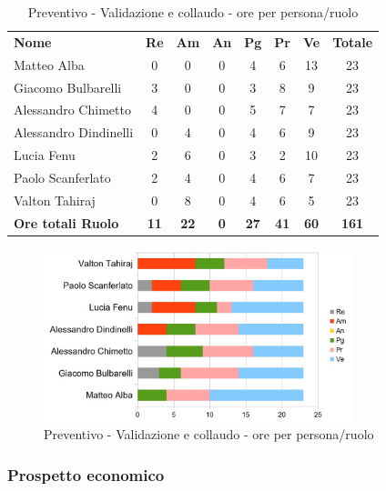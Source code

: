 		\begin{table} [h!]
			\begin{center}
				\begin{tabular} { m{3.5cm} c c c c c c c }
					\rowcolor{lightgray}
					\textbf{Nome} & \textbf{Re} & \textbf{Am} & \textbf{An} & \textbf{Pg} & \textbf{Pr} & \textbf{Ve} & \textbf{Totale} \\
					Matteo Alba & 0 & 0 & 0 & 4 & 6 & 13 & 23 \\
					Giacomo Bulbarelli & 3 & 0 & 0 & 3 & 8 & 9 & 23 \\
					Alessandro Chimetto & 4 & 0 & 0 & 5 & 7 & 7 & 23 \\
					Alessandro Dindinelli & 0 & 4 & 0 & 4 & 6 & 9 & 23 \\
					Lucia Fenu & 2 & 6 & 0 & 3 & 2 & 10 & 23 \\
					Paolo Scanferlato & 2 & 4 & 0 & 4 & 6 & 7 & 23 \\
					Valton Tahiraj & 0 & 8 & 0 & 4 & 6 & 5 & 23 \\
					\textbf{Ore totali Ruolo} & \textbf{11} & \textbf{22} & \textbf{0} & \textbf{27} & \textbf{41}& \textbf{60} & \textbf{161}
				\end{tabular}
				\caption{Preventivo - Validazione e collaudo - ore per persona/ruolo}
			\end{center}
		\end{table}
	
		\begin{figure} [h!]
			\centering
			\includegraphics[width=0.8\textwidth]{res/img/grafici/ValidazioneECollaudoOre.jpg}
			\caption{Preventivo - Validazione e collaudo - ore per persona/ruolo} 
		\end{figure}
	
	\newpage
	
	\subsubsection{Prospetto economico}
	
